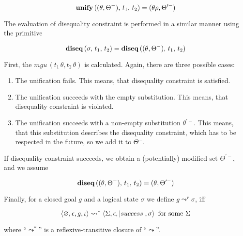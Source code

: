$$
{\bf unify}\,((\theta,\Theta^-),\,t_1,\,t_2)=(\theta\rho,\Theta^{\prime-})
$$

The evaluation of disequality constraint is performed in a similar manner using the primitive

$$
{\bf diseq}\,(\sigma,\,t_1,\,t_2)={\bf diseq}\,((\theta,\Theta^-),\,t_1,\,t_2)
$$

First, the $mgu\,(t_1\,\theta,t_2\,\theta)$ is calculated. Again, there are three
possible cases:

\begin{enumerate}
\item The unification fails. This means, that disequality constraint is satisfied.
\item The unification succeeds with the empty substitution. This means, that disequality
constraint is violated.
\item The unification succeeds with a non-empty substitution $\theta^{\prime-}$. This means, that 
this substitution describes the disequality constraint, which has to be respected in
the future, so we add it to $\Theta^-$. 
\end{enumerate}

If disequality constraint succeeds, we obtain a (potentially) modified set $\Theta^{\prime-}$, and we
assume

$$
{\bf diseq}\,((\theta,\Theta^-),\,t_1,\,t_2)=(\theta,\Theta^{\prime-})
$$

Finally, for a closed goal $g$ and a logical state $\sigma$ we define $g \leadsto^r \sigma$, iff

$$
\inbr{\emptyset,\epsilon,g,\iota}\leadsto^*\inbr{\Sigma,\epsilon,\lstinline|success|,\sigma}\mbox{ for some $\Sigma$}
$$
 
\noindent where ``$\leadsto^*$'' is a reflexive-transitive closure of ``$\leadsto$''. 




